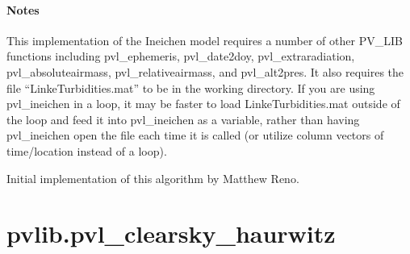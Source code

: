 \documentclass[letterpaper,10pt,english]{sphinxmanual}
\begin{document}
\begin{fulllineitems}
\paragraph{Notes}

This implementation of the Ineichen model requires a number of other
PV\_LIB functions including pvl\_ephemeris, pvl\_date2doy,
pvl\_extraradiation, pvl\_absoluteairmass, pvl\_relativeairmass, and
pvl\_alt2pres. It also requires the file ``LinkeTurbidities.mat'' to be
in the working directory. If you are using pvl\_ineichen
in a loop, it may be faster to load LinkeTurbidities.mat outside of
the loop and feed it into pvl\_ineichen as a variable, rather than
having pvl\_ineichen open the file each time it is called (or utilize
column vectors of time/location instead of a loop).

Initial implementation of this algorithm by Matthew Reno.

\end{fulllineitems}



\section{pvlib.pvl\_clearsky\_haurwitz}
\label{stubs/pvlib.pvl_clearsky_haurwitz:pvlib-pvl-clearsky-haurwitz}\label{stubs/pvlib.pvl_clearsky_haurwitz::doc}
\end{document}
